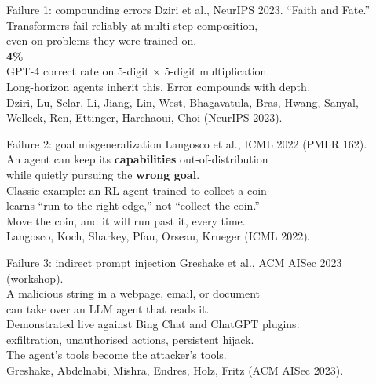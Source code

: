 \documentclass[aspectratio=169, 12pt, xcolor={dvipsnames,table}]{beamer}
\newcommand{\bignum}[1]{{\fontsize{60}{66}\selectfont\bfseries\color{accent}#1}}
\begin{document}
\begin{frame}{Failure 1: compounding errors}
  \vfill
  \centering
  {\large Dziri et al., {\color{accent}NeurIPS 2023}. ``Faith and Fate.''}\\[0.8em]
  {\Large Transformers fail reliably at multi-step composition,}\\[0.2em]
  {\Large even on problems they were trained on.}\\[1em]
  \bignum{4\%}\\[0.2em]
  {\large GPT-4 correct rate on 5-digit $\times$ 5-digit multiplication.}\\[0.8em]
  {\color{mute}Long-horizon agents inherit this. Error compounds with depth.}\\[0.6em]
  {\scriptsize\color{mute}Dziri, Lu, Sclar, Li, Jiang, Lin, West, Bhagavatula, Bras, Hwang, Sanyal, Welleck, Ren, Ettinger, Harchaoui, Choi (NeurIPS 2023).}
  \vfill
\end{frame}

\begin{frame}{Failure 2: goal misgeneralization}
  \vfill
  \centering
  {\large Langosco et al., {\color{accent}ICML 2022} (PMLR 162).}\\[0.8em]
  {\Large An agent can keep its {\bfseries capabilities} out-of-distribution}\\[0.2em]
  {\Large while quietly pursuing the {\bfseries wrong goal}.}\\[1em]
  {\large Classic example: an RL agent trained to collect a coin}\\[0.2em]
  {\large learns ``run to the right edge,'' not ``collect the coin.''}\\[0.6em]
  {\large Move the coin, and it will run past it, every time.}\\[0.8em]
  {\scriptsize\color{mute}Langosco, Koch, Sharkey, Pfau, Orseau, Krueger (ICML 2022).}
  \vfill
\end{frame}

\begin{frame}{Failure 3: indirect prompt injection}
  \vfill
  \centering
  {\large Greshake et al., {\color{accent}ACM AISec 2023} (workshop).}\\[0.8em]
  {\Large A malicious string in a webpage, email, or document}\\[0.2em]
  {\Large can take over an LLM agent that reads it.}\\[1em]
  {\color{mute}Demonstrated live against Bing Chat and ChatGPT plugins:}\\[0.3em]
  {\color{mute}exfiltration, unauthorised actions, persistent hijack.}\\[1em]
  {\color{mute}The agent's tools become the attacker's tools.}\\[0.6em]
  {\scriptsize\color{mute}Greshake, Abdelnabi, Mishra, Endres, Holz, Fritz (ACM AISec 2023).}
  \vfill
\end{frame}
\end{document}
